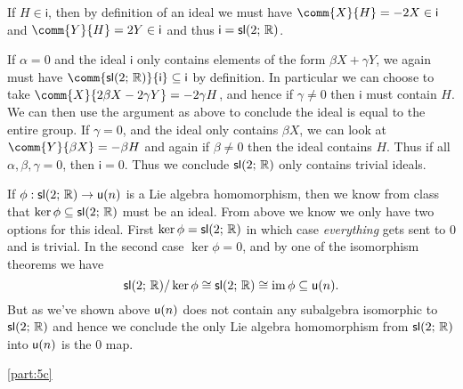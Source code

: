 \documentclass[
	pages,
	boxes,
	color=WildStrawberry
]{homework}
\theoremstyle{plain}
\begin{document}
\begin{solution}
	If $H\in\mathsf{i}$, then by definition of an ideal we must have $\comm{X}{H} = -2X\in\mathsf{i}$ and $\comm{Y}{H} = 2Y\in\mathsf{i}$ and thus $\mathsf{i} = \mathsf{sl}(2;\, \mathbb{R})$.

	If $\alpha = 0$ and the ideal $\mathsf{i}$ only contains elements of the form $\beta X + \gamma Y$, we again must have $\comm{\slie{2}{\R}}{\mathsf{i}}\subseteq \mathsf{i}$ by definition. In particular we can choose to take $\comm{X}{2\beta X - 2\gamma Y} = -2\gamma H$, and hence if $\gamma \neq 0$ then $\mathsf{i}$ must contain $H$. We can then use the argument as above to conclude the ideal is equal to the entire group. If $\gamma = 0$, and the ideal only contains $\beta X$, we can look at $\comm{Y}{\beta X} = -\beta H$ and again if $\beta \neq 0$ then the ideal contains $H$. Thus if all $\alpha, \beta, \gamma = 0$, then $\mathsf{i} = \qty{0}$. Thus we conclude $\mathsf{sl}(2;\, \mathbb{R})$ only contains trivial ideals.

	If $\phi: \mathsf{sl}(2;\, \mathbb{R}) \to \mathsf{u}(n)$ is a Lie algebra homomorphism, then we know from class that $\ker\phi\subseteq\mathsf{sl}(2;\, \mathbb{R})$ must be an ideal. From above we know we only have two options for this ideal. First $\ker\phi = \mathsf{sl}(2;\, \mathbb{R})$ in which case \emph{everything} gets sent to $0$ and is trivial. In the second case $\ker\phi = \qty{0}$, and by one of the isomorphism theorems we have
	\begin{equation*}
		\mathsf{sl}(2;\, \mathbb{R})/\ker{\phi}\cong\mathsf{sl}(2;\, \mathbb{R})\cong\operatorname{im}{\phi}\subseteq\mathsf{u}(n).
	\end{equation*}
	But as we've shown above $\mathsf{u}(n)$ does not contain any subalgebra isomorphic to $\mathsf{sl}(2;\, \mathbb{R})$ and hence we conclude the only Lie algebra homomorphism from $\mathsf{sl}(2;\, \mathbb{R})$ into $\mathsf{u}(n)$ is the $0$ map.

	\ref{part:5c}

\end{solution}
\end{document}
